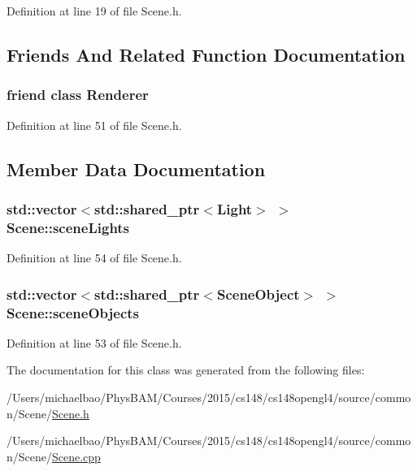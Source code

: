 Definition at line 19 of file Scene.\+h.



\subsection{Friends And Related Function Documentation}
\hypertarget{class_scene_a70538530bc36e033e360880ef311df61}{}
\subsubsection[{Renderer}]{\setlength{\rightskip}{0pt plus 5cm}friend class {\bf Renderer}\hspace{0.3cm}{\ttfamily [friend]}}\label{class_scene_a70538530bc36e033e360880ef311df61}


Definition at line 51 of file Scene.\+h.



\subsection{Member Data Documentation}
\hypertarget{class_scene_a847f4f9c485a56b084a1340811f0e726}{}
\subsubsection[{scene\+Lights}]{\setlength{\rightskip}{0pt plus 5cm}std\+::vector$<$std\+::shared\+\_\+ptr$<${\bf Light}$>$ $>$ Scene\+::scene\+Lights\hspace{0.3cm}{\ttfamily [private]}}\label{class_scene_a847f4f9c485a56b084a1340811f0e726}


Definition at line 54 of file Scene.\+h.

\hypertarget{class_scene_a871382922b2a04d7883cf6d34529b5df}{}
\subsubsection[{scene\+Objects}]{\setlength{\rightskip}{0pt plus 5cm}std\+::vector$<$std\+::shared\+\_\+ptr$<${\bf Scene\+Object}$>$ $>$ Scene\+::scene\+Objects\hspace{0.3cm}{\ttfamily [private]}}\label{class_scene_a871382922b2a04d7883cf6d34529b5df}


Definition at line 53 of file Scene.\+h.



The documentation for this class was generated from the following files\+:\begin{DoxyCompactItemize}
\item 
/\+Users/michaelbao/\+Phys\+B\+A\+M/\+Courses/2015/cs148/cs148opengl4/source/common/\+Scene/\hyperlink{_scene_8h}{Scene.\+h}\item 
/\+Users/michaelbao/\+Phys\+B\+A\+M/\+Courses/2015/cs148/cs148opengl4/source/common/\+Scene/\hyperlink{_scene_8cpp}{Scene.\+cpp}\end{DoxyCompactItemize}

